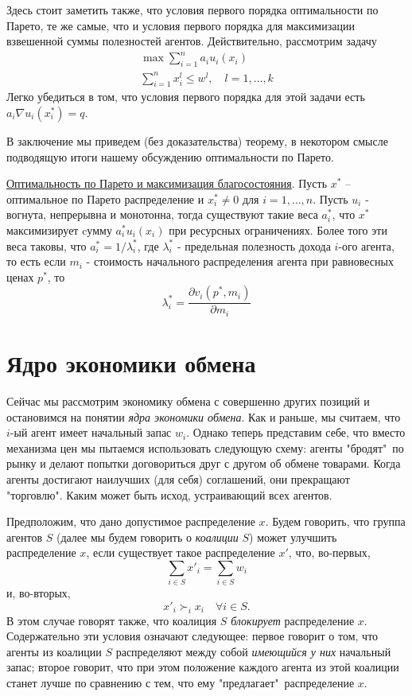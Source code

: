 Здесь стоит заметить также, что условия первого порядка оптимальности по
Парето, те же самые, что и условия первого порядка для максимизации
взвешенной суммы полезностей агентов. Действительно, рассмотрим задачу
$$
\begin{array}{c}
\max\sum^n_{i=1}a_iu_i(x_i)\\
\sum^n_{i=1}x^l_i\le w^l,\quad l=1,\ldots,k
\end{array}
$$
Легко убедиться в том, что условия первого порядка для этой задачи
есть $a_i\nabla u_i(x^*_i)=q$.

В заключение мы приведем (без доказательства) теорему, в некотором смысле
подводящую итоги нашему обсуждению оптимальности по Парето.

\underline{Оптимальность по Парето и максимизация благосостояния}.
Пусть $x^*$ -- оптимальное по Парето  распределение и $x^*_i \ne 0$
для $i=1,\ldots,n$. Пусть $u_i$ - вогнута, непрерывна и монотонна,
тогда существуют такие веса $a^*_i$, что $x^*$ максимизирует cумму
$a^*_iu_i(x_i)$ при ресурсных ограничениях. Более того эти веса
таковы, что $a^*_i=1/\lambda^*_i$, где $\lambda^*_i$ - предельная
полезность дохода $i$-ого агента, то есть если $m_i$ - стоимость
начального распределения агента при равновесных ценах $p^*$, то
$$
\lambda^*_i={\frac{\partial v_i(p^*,m_i)}{\partial m_i}}
$$

\section*{Ядро экономики обмена}

Сейчас мы рассмотрим экономику обмена с совершенно других позиций и остановимся
на понятии \emph{ядра экономики обмена}. Как и раньше, мы считаем, что $i$-ый агент имеет
начальный запас $w_i$. Однако теперь представим себе, что вместо
механизма цен мы пытаемся использовать следующую схему: агенты "бродят"\,
по рынку и делают попытки договориться друг с другом об обмене товарами. Когда агенты
достигают наилучших (для себя) соглашений, они прекращают "торговлю".
Каким может быть исход, устраивающий всех агентов.

Предположим, что дано допустимое распределение $x$. Будем говорить, что группа
агентов $S$ (далее мы будем говорить о \emph{коалиции} $S$) может улучшить распределение $x$,
если существует такое распределение $x'$, что, во-первых,
$$\sum_{i\in S}x'_i=\sum_{i\in S}w_i$$
и, во-вторых,
$$
x'_i\succ_i x_i\quad\forall i\in S.
$$
В этом случае говорят также, что коалиция $S$ \emph{блокирует} распределение $x$.
Содержательно эти условия означают следующее: первое говорит о том, что
агенты из коалиции $S$ распределяют между собой
\emph{имеющийся у них} начальный запас; второе говорит, что при этом
положение каждого агента из этой коалиции станет лучше по сравнению с
тем, что ему "предлагает"\, распределение $x$.

